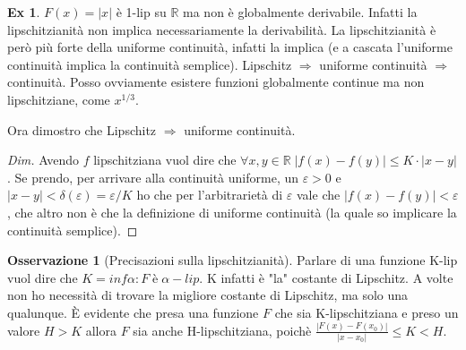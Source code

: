 \documentclass{article}
\theoremstyle{definition}
\theoremstyle{definition}
\theoremstyle{definition}
\theoremstyle{definition}
\newtheorem{remark}{Osservazione}[section]
\theoremstyle{definition}
\newtheorem{example}{Ex}[section]
\begin{document}
\begin{example}
    $F(x)=\left|x\right|$ è 1-lip su $\mathbb{R}$ ma non è globalmente derivabile. Infatti la lipschitzianità non implica necessariamente la derivabilità. La lipschitzianità è però più forte della uniforme continuità, infatti la implica (e a cascata l'uniforme continuità implica la continuità semplice). Lipschitz $\Rightarrow$ uniforme continuità $\Rightarrow$ continuità. Posso ovviamente esistere funzioni globalmente continue ma non lipschitziane, come $x^{1/3}$.
    
    Ora dimostro che Lipschitz $\Rightarrow$ uniforme continuità.
    \begin{proof}[Dim]
        Avendo $f$ lipschitziana vuol dire che $\forall x,y\in\mathbb{R} \; \left|f(x)-f(y)\right| \leq K\cdot \left|x-y\right|$. Se prendo, per arrivare alla continuità uniforme, un $\varepsilon>0$ e $\left|x-y\right|<\delta(\varepsilon)=\varepsilon/K$ ho che per l'arbitrarietà di $\varepsilon$ vale che $\left|f(x)-f(y)\right| < \varepsilon$, che altro non è che la definizione di uniforme continuità (la quale so implicare la continuità semplice).
    \end{proof}
\end{example}

\begin{remark}[Precisazioni sulla lipschitzianità]
    Parlare di una funzione K-lip vuol dire che $K=inf \alpha: F \;\text{è}\; \alpha-lip$. K infatti è "la" costante di Lipschitz. A volte non ho necessità di trovare la migliore costante di Lipschitz, ma solo una qualunque. È evidente che presa una funzione $F$ che sia K-lipschitziana e preso un valore $H>K$ allora $F$ sia anche H-lipschitziana, poichè $\displaystyle{\frac{\left|F(x)-F(x_0)\right|}{\left|x-x_0\right|}\leq K<H}$.
\end{remark}
\end{document}
